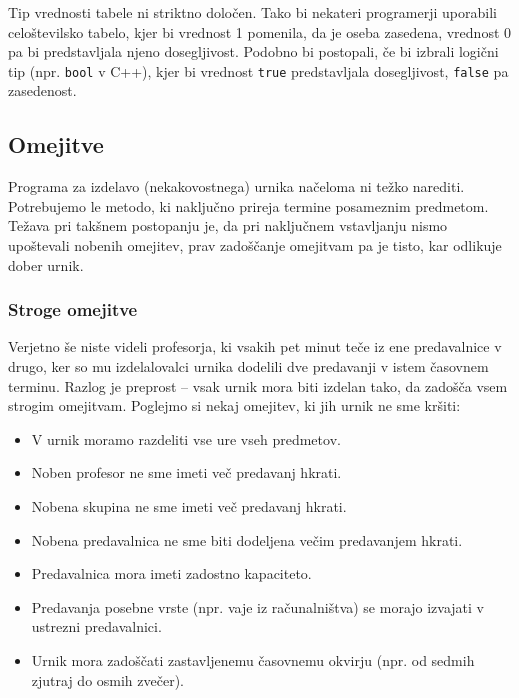 \documentclass[10pt, a4paper]{article}
\begin{document}
Tip vrednosti tabele ni striktno določen. Tako bi nekateri programerji uporabili
celoštevilsko tabelo, kjer bi vrednost 1 pomenila, da je oseba zasedena, vrednost 0
pa bi predstavljala njeno dosegljivost. Podobno bi postopali, če bi izbrali logični
tip (npr. \texttt{bool} v C++), kjer bi vrednost \texttt{true} predstavljala
dosegljivost, \texttt{false} pa zasedenost.

\subsection{Omejitve}

Programa za izdelavo (nekakovostnega) urnika načeloma ni težko narediti. Potrebujemo
le metodo, ki naključno prireja termine posameznim predmetom. Težava pri takšnem postopanju
je, da pri naključnem vstavljanju nismo upoštevali nobenih omejitev, prav zadoščanje omejitvam
pa je tisto, kar odlikuje dober urnik.

\subsubsection{Stroge omejitve}

Verjetno še niste videli profesorja, ki vsakih pet minut teče iz ene predavalnice v drugo,
ker so mu izdelalovalci urnika dodelili dve predavanji v istem časovnem terminu. Razlog
je preprost -- vsak urnik mora biti izdelan tako, da zadošča vsem strogim omejitvam.
Poglejmo si nekaj omejitev, ki jih urnik ne sme kršiti:

\begin{itemize}
   \item V urnik moramo razdeliti vse ure vseh predmetov.
   \item Noben profesor ne sme imeti več predavanj hkrati.
   \item Nobena skupina ne sme imeti več predavanj hkrati.
   \item Nobena predavalnica ne sme biti dodeljena večim predavanjem hkrati.
   \item Predavalnica mora imeti zadostno kapaciteto.
   \item Predavanja posebne vrste (npr. vaje iz računalništva) se morajo izvajati v ustrezni predavalnici.
   \item Urnik mora zadoščati zastavljenemu časovnemu okvirju (npr. od sedmih zjutraj do osmih zvečer).
\end{itemize}
\end{document}
